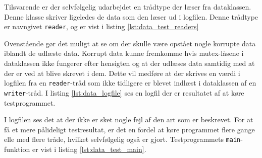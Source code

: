

Tilsvarende er der selvfølgelig udarbejdet en trådtype der læser fra dataklassen. Denne klasse skriver ligeledes de data som den læser ud i logfilen. Denne trådtype er navngivet \texttt{reader}, og er vist i listing \ref{lst:data_test_readers}



Ovenstående gør det muligt at se om der skulle være opstået nogle korrupte data iblandt de udlæste data. Korrupt data kunne fremkomme hvis mutex-låsene i dataklassen ikke fungerer efter hensigten og at der udlæses data samtidig med at der er ved at blive skrevet i dem. Dette vil medføre at der skrives en værdi i logfilen fra en \texttt{reader}-tråd som ikke tidligere er blevet indlæst i dataklassen af en \texttt{writer}-tråd. I listing \ref{lst:data_logfile} ses en logfil der er resultatet af at køre testprogrammet.



I logfilen ses det at der ikke er sket nogle fejl af den art som er beskrevet. For at få et mere pålideligt testresultat, er det en fordel at køre programmet flere gange elle med flere tråde, hvilket selvfølgelig også er gjort. Testprogrammets \texttt{main}-funktion er vist i listing \ref{lst:data_test_main}.

